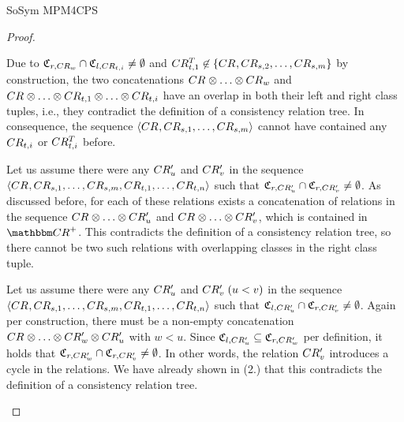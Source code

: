 \begin{copiedFrom}{SoSym MPM4CPS}
\begin{proof}
\begin{properenumerate}
    Due to $\mathfrak{C}_{r,CR_{w}} \cap \mathfrak{C}_{l,CR_{t,i}} \neq \emptyset$ and  $CR^T_{t,1} \not\in \{ CR_{}, CR_{s,2}, \dots, CR_{s,m} \}$ by construction, the two concatenations $\consistencyrelation{CR}{} \concat \dots \concat \consistencyrelation{CR}{w}$ and $\consistencyrelation{CR}{} \concat \dots \concat \consistencyrelation{CR}{t,1} \concat \dots \concat \consistencyrelation{CR}{t,i}$ have an overlap in both their left and right class tuples, i.e., they contradict the definition of a consistency relation tree.
    In consequence, the sequence $\langle CR_{}, CR_{s,1}, \dots, CR_{s,m} \rangle$ cannot have contained any $CR_{t,i}$ or $CR^T_{t,i}$ before.
        \item 
    Let us assume there were any $CR'_{u}$ and $CR'_{v}$ in the sequence $\langle CR_{}, CR_{s,1}, \dots, CR_{s,m}, CR_{t,1}, \dots, CR_{t,n} \rangle$ such that $\mathfrak{C}_{r,CR'_{u}} \cap \mathfrak{C}_{r,CR'_{v}} \neq \emptyset$.
    As discussed before, for each of these relations exists a concatenation of relations in the sequence $\consistencyrelation{CR}{} \concat \dots \concat \consistencyrelation{CR'}{u}$ and $\consistencyrelation{CR}{} \concat \dots \concat \consistencyrelation{CR'}{v}$, which is contained in $\transitiveclosure{\consistencyrelationset{CR}}$.
    This contradicts the definition of a consistency relation tree, so there cannot be two such relations with overlapping classes in the right class tuple.
        \item
    Let us assume there were any $CR'_{u}$ and $CR'_{v}\; (u < v)$ in the sequence $\langle CR_{}, CR_{s,1}, \dots, CR_{s,m}, CR_{t,1}, \dots, CR_{t,n} \rangle$ such that $\mathfrak{C}_{l,CR'_{u}} \cap \mathfrak{C}_{r,CR'_{v}} \neq \emptyset$.
    Again per construction, there must be a non-empty concatenation $\consistencyrelation{CR}{} \concat \dots \concat \consistencyrelation{CR'}{w} \concat \consistencyrelation{CR'}{u}$ with $w < u$. Since $\mathfrak{C}_{l,CR'_{u}} \subseteq \mathfrak{C}_{r,CR'_{w}}$ per definition, it holds that
    $\mathfrak{C}_{r,CR'_{w}} \cap \mathfrak{C}_{r,CR'_{v}} \neq \emptyset$.
    In other words, the relation $CR'_{v}$ introduces a cycle in the relations.
    We have already shown in (2.) that this contradicts the definition of a consistency relation tree.
    \end{properenumerate}


\end{proof}
\end{copiedFrom}
